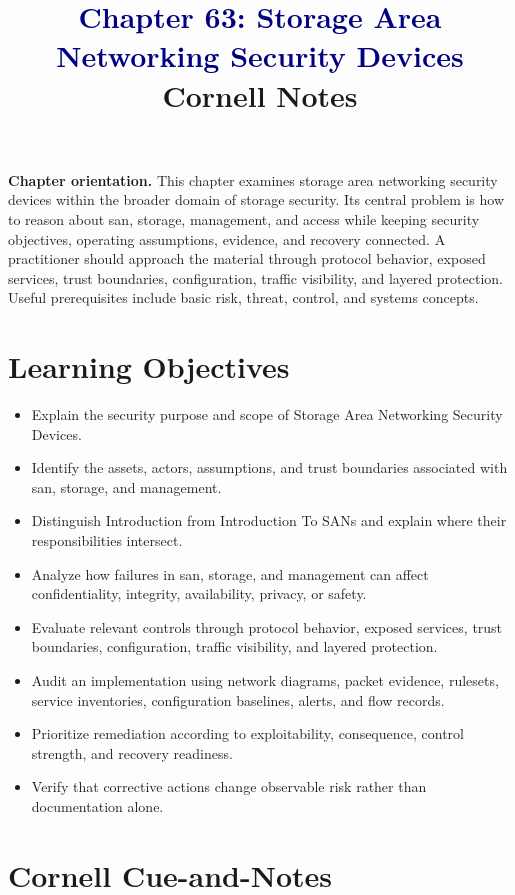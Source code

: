 \documentclass[11pt]{article}
\title{\textcolor{Navy}{Chapter 63: Storage Area Networking Security Devices}\\[2mm]\large Cornell Notes}
\author{}
\date{}
\begin{document}
\maketitle
\thispagestyle{fancy}
\vspace{-1.5em}
\begin{orientationbox}
\textbf{Chapter orientation.} This chapter examines storage area networking security devices within the broader domain of storage security. Its central problem is how to reason about san, storage, management, and access while keeping security objectives, operating assumptions, evidence, and recovery connected. A practitioner should approach the material through protocol behavior, exposed services, trust boundaries, configuration, traffic visibility, and layered protection. Useful prerequisites include basic risk, threat, control, and systems concepts.
\end{orientationbox}
\section*{Learning Objectives}
\begin{itemize}
\item Explain the security purpose and scope of Storage Area Networking Security Devices.
\item Identify the assets, actors, assumptions, and trust boundaries associated with san, storage, and management.
\item Distinguish Introduction from Introduction To SANs and explain where their responsibilities intersect.
\item Analyze how failures in san, storage, and management can affect confidentiality, integrity, availability, privacy, or safety.
\item Evaluate relevant controls through protocol behavior, exposed services, trust boundaries, configuration, traffic visibility, and layered protection.
\item Audit an implementation using network diagrams, packet evidence, rulesets, service inventories, configuration baselines, alerts, and flow records.
\item Prioritize remediation according to exploitability, consequence, control strength, and recovery readiness.
\item Verify that corrective actions change observable risk rather than documentation alone.
\end{itemize}
\section*{Cornell Cue-and-Notes}
\end{document}
